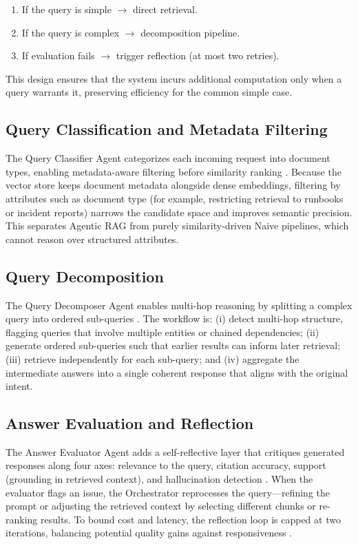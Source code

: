 \documentclass[conference]{IEEEtran}
\begin{document}
\begin{enumerate}
  \item If the query is simple $\rightarrow$ direct retrieval.
  \item If the query is complex $\rightarrow$ decomposition pipeline.
  \item If evaluation fails $\rightarrow$ trigger reflection (at most two retries).
\end{enumerate}

This design ensures that the system incurs additional computation only when a query warrants it, preserving efficiency for the common simple case.

\subsection{Query Classification and Metadata Filtering}
The Query Classifier Agent categorizes each incoming request into document types, enabling metadata-aware filtering before similarity ranking \cite{wandb2024agentic}. Because the vector store keeps document metadata alongside dense embeddings, filtering by attributes such as document type (for example, restricting retrieval to runbooks or incident reports) narrows the candidate space and improves semantic precision. This separates Agentic RAG from purely similarity-driven Naive pipelines, which cannot reason over structured attributes.

\subsection{Query Decomposition}
The Query Decomposer Agent enables multi-hop reasoning by splitting a complex query into ordered sub-queries \cite{zhou2023leasttomost, shi2026reasoning}. The workflow is: (i) detect multi-hop structure, flagging queries that involve multiple entities or chained dependencies; (ii) generate ordered sub-queries such that earlier results can inform later retrieval; (iii) retrieve independently for each sub-query; and (iv) aggregate the intermediate answers into a single coherent response that aligns with the original intent.

\subsection{Answer Evaluation and Reflection}
The Answer Evaluator Agent adds a self-reflective layer that critiques generated responses along four axes: relevance to the query, citation accuracy, support (grounding in retrieved context), and hallucination detection \cite{asai2024selfrag, madaan2023selfrefine}. When the evaluator flags an issue, the Orchestrator reprocesses the query---refining the prompt or adjusting the retrieved context by selecting different chunks or re-ranking results. To bound cost and latency, the reflection loop is capped at two iterations, balancing potential quality gains against responsiveness \cite{hu2024selfcorrection}.
\end{document}
